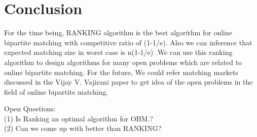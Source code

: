 \documentclass[conference,compsoc]{IEEEtran}
\begin{document}




\section{Conclusion}
For the time being, RANKING algorithm is the best algorithm for online bipartite matching with competitive ratio of (1-1/e). Also we can inference that expected matching size in worst case is n(1-1/e) .We can use this ranking algorithm to design algorithms for many open problems which are related to online bipartite matching. For the future, We could refer matching markets discussed in the Vijay V. Vajirani paper to get idea of the open problems in the field of online bipartite matching. 

Open Questions:\\
(1) Is Ranking an optimal algorithm for OBM.? \\
(2) Can we come up with better than RANKING? \\








\ifCLASSOPTIONcompsoc







\end{document}
